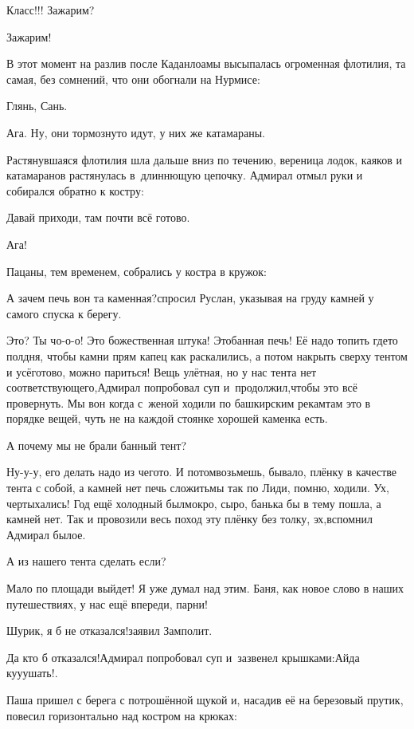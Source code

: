 \diagdash Класс!!! Зажарим?

\diagdash Зажарим!

В этот момент на разлив после Каданлоамы высыпалась огроменная флотилия, та самая, без сомнений, что они обогнали на Нурмисе:

\diagdash Глянь, Сань.

\diagdash Ага. Ну, они тормознуто идут, у них же катамараны.

Растянувшаяся флотилия шла дальше вниз по течению, вереница лодок, каяков и катамаранов растянулась в~длиннющую цепочку. Адмирал отмыл руки и собирался обратно к костру:

\diagdash Давай приходи, там почти всё готово.

\diagdash Ага!

Пацаны, тем временем, собрались у костра в кружок:

\diagdash А зачем печь вон та каменная?\mdash спросил Руслан, указывая на груду камней у самого спуска к берегу.

\diagdash Это? Ты чо-о-о! Это божественная штука! Это\mdash банная печь! Её надо топить где\sdash то полдня, чтобы камни прям капец как раскалились, а потом накрыть сверху тентом и усё\mdash готово, можно париться! Вещь улётная, но у нас тента нет соответствующего,\mdash Адмирал попробовал суп и~продолжил,\mdash чтобы это всё провернуть. Мы вон когда с~женой ходили по башкирским рекам\mdash там это в порядке вещей, чуть не на каждой стоянке хорошей каменка есть.

\diagdash А почему мы не брали банный тент?

\diagdash Ну-у-у, его делать надо из чего\sdash то. И потом\mdash возьмешь, бывало, плёнку в качестве тента с собой, а камней нет печь сложить\mdash мы так по Лиди, помню, ходили. Ух, чертыхались! Год ещё холодный был\mdash мокро, сыро, банька бы в тему пошла, а камней нет. Так и провозили весь поход эту плёнку без толку, эх,\mdash вспомнил Адмирал былое.

\diagdash А из нашего тента сделать если?

\diagdash Мало по площади выйдет! Я уже думал над этим. Баня, как новое слово в наших путешествиях, у нас ещё впереди, парни!

\diagdash Шурик, я б не отказался!\mdash заявил Замполит.

\diagdash Да кто б отказался!\mdash Адмирал попробовал суп и~зазвенел крышками:\mdash Айда ку\sdash у\sdash ушать!.

Паша пришел с берега с потрошённой щукой и, насадив её на березовый прутик, повесил горизонтально над костром на крюках:

